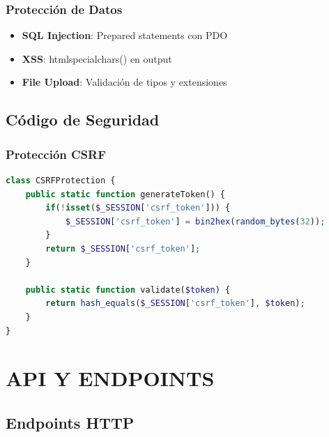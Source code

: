 \documentclass[12pt, a4paper]{report}
\begin{document}
\subsection{Protección de Datos}
\begin{itemize}
    \item \textbf{SQL Injection}: Prepared statements con PDO
    \item \textbf{XSS}: htmlspecialchars() en output
    \item \textbf{File Upload}: Validación de tipos y extensiones
\end{itemize}

\section{Código de Seguridad}
\subsection{Protección CSRF}
\begin{lstlisting}[language=PHP]
class CSRFProtection {
    public static function generateToken() {
        if(!isset($_SESSION['csrf_token'])) {
            $_SESSION['csrf_token'] = bin2hex(random_bytes(32));
        }
        return $_SESSION['csrf_token'];
    }
    
    public static function validate($token) {
        return hash_equals($_SESSION['csrf_token'], $token);
    }
}
\end{lstlisting}

\chapter{API Y ENDPOINTS}

\section{Endpoints HTTP}
\end{document}
